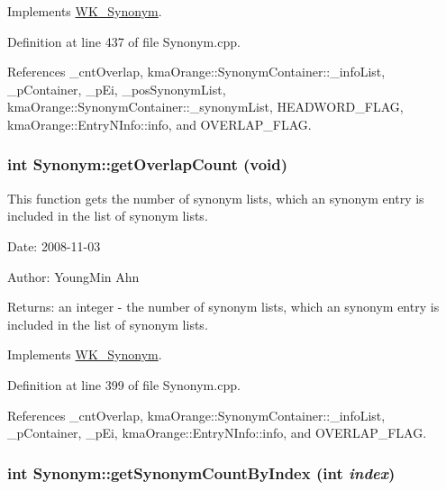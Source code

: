 Implements \hyperlink{classWK__Synonym_50cacdd04cddb986eed20886aad03351}{WK\_\-Synonym}.

Definition at line 437 of file Synonym.cpp.

References \_\-cntOverlap, kmaOrange::SynonymContainer::\_\-infoList, \_\-pContainer, \_\-pEi, \_\-posSynonymList, kmaOrange::SynonymContainer::\_\-synonymList, HEADWORD\_\-FLAG, kmaOrange::EntryNInfo::info, and OVERLAP\_\-FLAG.\hypertarget{classkmaOrange_1_1Synonym_0004ea3dc231d3740211d96d036ef976}{
\subsubsection[{getOverlapCount}]{\setlength{\rightskip}{0pt plus 5cm}int Synonym::getOverlapCount (void)}}
\label{classkmaOrange_1_1Synonym_0004ea3dc231d3740211d96d036ef976}


This function gets the number of synonym lists, which an synonym entry is included in the list of synonym lists. 

\begin{Desc}
\item[Date:]2008-11-03 \end{Desc}
\begin{Desc}
\item[Author:]YoungMin Ahn \end{Desc}
\begin{Desc}
\item[Returns:]an integer - the number of synonym lists, which an synonym entry is included in the list of synonym lists. \end{Desc}


Implements \hyperlink{classWK__Synonym_a2ba8f7959f61d8b551e6982bcebc459}{WK\_\-Synonym}.

Definition at line 399 of file Synonym.cpp.

References \_\-cntOverlap, kmaOrange::SynonymContainer::\_\-infoList, \_\-pContainer, \_\-pEi, kmaOrange::EntryNInfo::info, and OVERLAP\_\-FLAG.\hypertarget{classkmaOrange_1_1Synonym_7d808654c78ba40bca5caa7d622e931d}{
\subsubsection[{getSynonymCountByIndex}]{\setlength{\rightskip}{0pt plus 5cm}int Synonym::getSynonymCountByIndex (int {\em index})}}
\label{classkmaOrange_1_1Synonym_7d808654c78ba40bca5caa7d622e931d}


